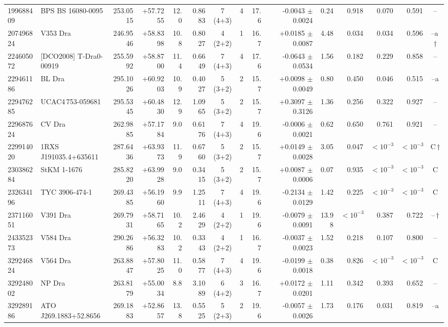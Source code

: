 \documentclass{aa}
\begin{document}
\begin{table}
\begin{tabular}{l l r r r r c c r r r r r r c}
199688409 & BPS BS 16080-0095 & 253.0515 & +57.7255 & 12.0 & 0.8683 & 7 (4+3) & 4 & 17.6 & -0.0043 $\pm$ 0.0024 & 0.24 & 0.918 & 0.070 & 0.591 & --\\
207496824 & V353 Dra & 246.9546 & +58.8398 & 10.8 & 0.8027 & 4 (2+2) & 1 & 16.7 & +0.0185 $\pm$ 0.0087 & 4.48 & 0.034 & 0.034 & 0.596 & --a\,$\dagger$\\
224605072 & [DCO2008] T-Dra0-00919 & 255.5992 & +58.8700 & 11.4 & 0.6649 & 7 (4+3) & 4 & 17.6 & -0.0643 $\pm$ 0.0534 & 1.56 & 0.182 & 0.229 & 0.858 & --\\
229461186 & BL Dra & 295.1026 & +60.9203 & 10.9 & 0.4027 & 5 (3+2) & 2 & 15.7 & +0.0098 $\pm$ 0.0049 & 0.80 & 0.450 & 0.046 & 0.515 & --a\\
229476285 & UCAC4\,753-059681 & 295.5345 & +60.4830 & 12.9 & 1.0965 & 5 (3+2) & 2 & 15.7 & +0.3097 $\pm$ 0.3126 & 1.36 & 0.256 & 0.322 & 0.927 & --\\
229687624 & CV Dra & 262.9885 & +57.1784 & 9.0 & 0.6176 & 7 (4+3) & 4 & 19.6 & -0.0006 $\pm$ 0.0021 & 0.62 & 0.650 & 0.761 & 0.921 & --\\
229914020 & 1RXS J191035.4+635611 & 287.6436 & +63.9373 & 11.9 & 0.6760 & 5 (3+2) & 2 & 15.7 & +0.0149 $\pm$ 0.0028 & 3.05 & 0.047 & $<10^{-3}$ & $<10^{-3}$ & C\,$\dagger$\\
230386284 & StKM 1-1676 & 285.8220 & +63.9928 & 9.0 & 0.3415 & 5 (3+2) & 2 & 15.7 & +0.0087 $\pm$ 0.0006 & 0.07 & 0.935 & $<10^{-3}$ & $<10^{-3}$ & C\\
232634196 & TYC 3906-474-1 & 269.4385 & +56.1960 & 9.9 & 1.2511 & 7 (4+3) & 4 & 19.6 & -0.2134 $\pm$ 0.0129 & 1.42 & 0.225 & $<10^{-3}$ & $<10^{-3}$ & C\\
237116051 & V391 Dra & 269.7931 & +58.7165 & 10.2 & 2.4629 & 4 (2+2) & 1 & 19.6 & -0.0079 $\pm$ 0.0091 & 13.98 & $<10^{-3}$ & 0.387 & 0.722 & --\,$\dagger$\\
243352373 & V584 Dra & 290.2686 & +56.3283 & 10.2 & 0.3343 & 4 (2+2) & 1 & 16.7 & -0.0037 $\pm$ 0.0023 & 1.52 & 0.218 & 0.107 & 0.800 & --\\
329246824 & V564 Dra & 263.8847 & +57.8025 & 11.0 & 0.5877 & 7 (4+3) & 4 & 19.6 & -0.0199 $\pm$ 0.0018 & 0.38 & 0.826 & $<10^{-3}$ & $<10^{-3}$ & C\\
329248002 & NP Dra & 263.8179 & +55.0034 & 8.8 & 3.1089 & 6 (4+2) & 3 & 16.7 & +0.0172 $\pm$ 0.0201 & 1.11 & 0.342 & 0.393 & 0.652 & --\\
329289186 & ATO J269.1883+52.8656 & 269.1883 & +52.8657 & 13.8 & 0.5525 & 5 (2+3) & 2 & 19.6 & -0.0057 $\pm$ 0.0026 & 1.73 & 0.176 & 0.031 & 0.819 & --a\\

\end{tabular}
\end{table}
\end{document}
